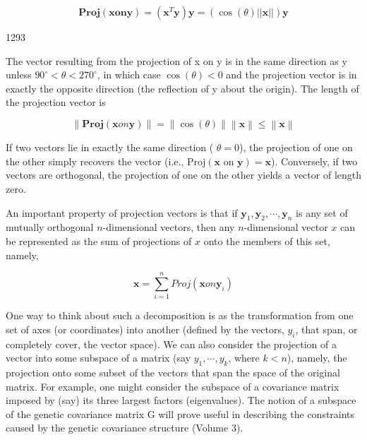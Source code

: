 \documentclass{article}
\begin{document}
\begin{equation}
\mathbf{P r o j}(\mathbf{x}\mathbf{o n}\mathbf{y})=(\mathbf{x}^{T}\mathbf{y})\mathbf{y}=(\cos(\theta)\left|\left|\mathbf{x}\right|\right|)\mathbf{y}
\end{equation}

1293

The vector resulting from the projection of x on y is in the same direction as y unless  $ 90^\circ < \theta < 270^\circ $, in which case  $ \cos(\theta) < 0 $ and the projection vector is in exactly the opposite direction (the reflection of y about the origin). The length of the projection vector is

\begin{equation}
\left\| \mathbf{Proj}(\mathbf{x}on\mathbf{y}) \right\|= \left\| \cos(\theta) \right\| \left\| \mathbf{x} \right\|\leq \left\| \mathbf{x} \right\|
\end{equation}

If two vectors lie in exactly the same direction ( $ \theta = 0 $), the projection of one on the other simply recovers the vector (i.e.,  $ \text{Proj}(\mathbf{x} \text{ on } \mathbf{y}) = \mathbf{x} $). Conversely, if two vectors are orthogonal, the projection of one on the other yields a vector of length zero.

An important property of projection vectors is that if  $ \mathbf{y}_1, \mathbf{y}_2, \cdots, \mathbf{y}_n $ is any set of mutually orthogonal  $ n $-dimensional vectors, then any  $ n $-dimensional vector  $ x $ can be represented as the sum of projections of  $ x $ onto the members of this set, namely,

\begin{equation}
\mathbf{x}=\sum_{i=1}^{n}Proj(\mathbf{x}on\mathbf{y}_{i})
\end{equation}

One way to think about such a decomposition is as the transformation from one set of axes (or coordinates) into another (defined by the vectors,  $ y_i $, that span, or completely cover, the vector space). We can also consider the projection of a vector into some subspace of a matrix (say  $ y_1, \cdots, y_k $, where  $ k < n $), namely, the projection onto some subset of the vectors that span the space of the original matrix. For example, one might consider the subspace of a covariance matrix imposed by (say) its three largest factors (eigenvalues). The notion of a subspace of the genetic covariance matrix G will prove useful in describing the constraints caused by the genetic covariance structure (Volume 3).
\end{document}

